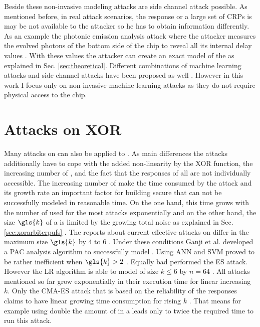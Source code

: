 Beside these non-invasive modeling attacks are side channel attack possible.
As mentioned before, in real attack scenarios, the \puf response or a large set of \acp{CRP} is may be not available to the attacker so he has to obtain information differently.
As an example the photonic emission analysis attack where the attacker measures the evolved photons of the bottom side of the \apuf chip to reveal all its internal delay values \cite{Tajik2014PhysicalPUFs}.
With these values the attacker can create an exact model of the \apuf as explained in Sec. \ref{sec:theoretical}.
Different combinations of machine learning attacks and side channel attacks have been proposed as well \cite{Mahmoud2013CombinedPUFs, Xu2014Hybrid}.
However in this work I focus only on non-invasive machine learning attacks as they do not require physical access to the \apuf chip.


\section{Attacks on \acs{XOR} \apufs}
\label{sec:attacksonxorarbiter}

Many attacks on \apufs can also be applied to \xpufs.
As main differences the attacks additionally have to cope with the added non-linearity by the \ac{XOR} function, the increasing number of \apufs, and the fact that the responses of all \apufs are not individually accessible.
The increasing number of \apufs make the time consumed by the attack and its growth rate an important factor for building secure \xpufs that can not be successfully modeled in reasonable time.
On the one hand, this time grows with the number of used \apufs for the most attacks exponentially and on the other hand, the size $\gls{k}$ of a \xpuf is limited by the growing total noise as explained in Sec. \ref{sec:xorarbiterpufs} \cite{Ruhrmair2010ModelingFunctions}.
The reports about current effective attacks on \xpufs differ in the maximum size $\gls{k}$ by $4$ to $6$ \cite{Ganji2015WhyPUFs, Xu2014Hybrid}.
Under these conditions Ganji et al. developed a \ac{PAC} analysis algorithm to successfully model \xpufs \cite{Ganji2015WhyPUFs}.
Using \ac{ANN} and \ac{SVM} proved to be rather inefficient when $\gls{k} > 2$ \cite{Hospodar2012MachineUsability}.
Equally bad performed the \ac{ES} attack.
However the \ac{LR} algorithm is able to model \xpufs of size $k \le 6$ by $n = 64$ \cite{Ruhrmair2010ModelingFunctions}.
All attacks mentioned so far grow exponentially in their execution time for linear increasing $k$.
Only the \ac{CMA-ES} attack that is based on the reliability of the responses claims to have linear growing time consumption for rising $k$ \cite{Becker2015ThePUFs}.
That means for example using double the amount of \apufs in a \xpufs leads only to twice the required time to run this attack.


